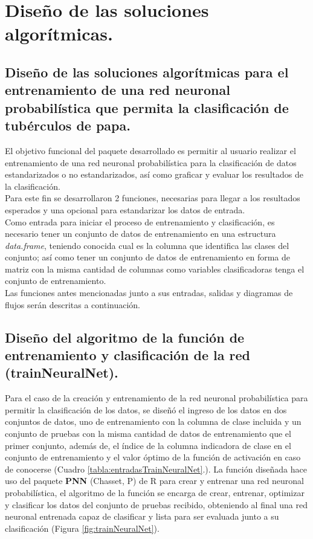 \section{Diseño de las soluciones algorítmicas.}

\subsection{Diseño de las soluciones algorítmicas para el entrenamiento de una red neuronal probabilística que permita la clasificación de tubérculos de papa.}

	El objetivo funcional del paquete desarrollado es permitir al usuario realizar el entrenamiento de una red neuronal probabilística para la clasificación de datos estandarizados o no estandarizados, así como graficar y evaluar los resultados de la clasificación.\\

	Para este fin se desarrollaron 2 funciones, necesarias para llegar a los resultados esperados y una opcional para estandarizar los datos de entrada. \\

	Como entrada para iniciar el proceso de entrenamiento y clasificación, es necesario tener un  conjunto de datos de entrenamiento en una estructura \textit{ data.frame}, teniendo conocida cual es la columna que identifica las clases del conjunto; así como tener un conjunto de datos de entrenamiento en forma de matriz con la misma cantidad de columnas como variables clasificadoras tenga el conjunto de entrenamiento.\\

	Las funciones antes mencionadas junto a sus entradas, salidas y diagramas de flujos serán descritas a continuación.\\


\subsection{Diseño del algoritmo de la función de entrenamiento y clasificación de la red (trainNeuralNet).}

	Para el caso de la creación y entrenamiento de la red neuronal probabilística para permitir la clasificación de los datos, se diseñó el ingreso de los datos en dos conjuntos de datos, uno de entrenamiento con la columna de clase incluida y un conjunto de pruebas con la misma cantidad de datos de entrenamiento que el primer conjunto, además de, el índice de la columna indicadora de clase en el conjunto de entrenamiento y el valor óptimo de la función de activación en caso de conocerse (Cuadro \ref{tabla:entradasTrainNeuralNet}.). La función diseñada hace uso del paquete \textbf{PNN} (Chasset, P) de R para crear y entrenar una red neuronal probabilística, el algoritmo de la función se encarga de crear, entrenar, optimizar y clasificar los datos del conjunto de pruebas recibido, obteniendo al final una red neuronal entrenada capaz de clasificar y lista para ser evaluada junto a su clasificación (Figura \ref{fig:trainNeuralNet}).\\

